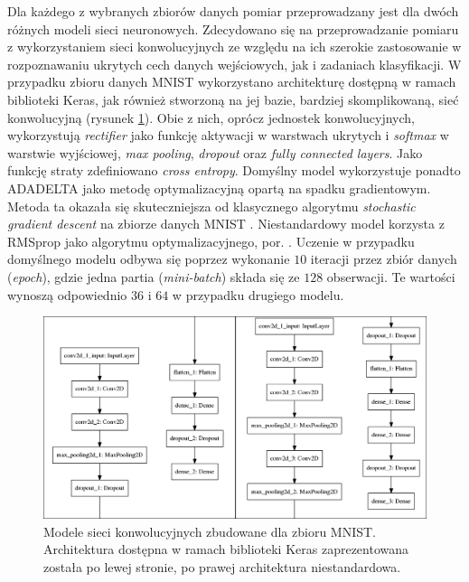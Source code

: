 \documentclass[12pt,a4paper,twoside]{article}
\begin{document}
Dla każdego z wybranych zbiorów danych pomiar przeprowadzany jest dla dwóch różnych modeli sieci neuronowych. Zdecydowano się na przeprowadzanie pomiaru z wykorzystaniem sieci konwolucyjnych ze względu na ich szerokie zastosowanie w rozpoznawaniu ukrytych cech danych wejściowych, jak i zadaniach klasyfikacji. W przypadku zbioru danych MNIST wykorzystano architekturę dostępną w ramach biblioteki Keras, jak również stworzoną na jej bazie, bardziej skomplikowaną, sieć konwolucyjną (rysunek \ref{fig:mnist_cnn}). Obie z nich, oprócz jednostek konwolucyjnych, wykorzystują \textit{rectifier} jako funkcję aktywacji w warstwach ukrytych i \textit{softmax} w warstwie wyjściowej, \textit{max pooling}, \textit{dropout} oraz \textit{fully connected layers}. Jako funkcję straty zdefiniowano \textit{cross entropy}. Domyślny model wykorzystuje ponadto ADADELTA jako metodę optymalizacyjną opartą na spadku gradientowym. Metoda ta okazała się skuteczniejsza od klasycznego algorytmu \textit{stochastic gradient descent}
na zbiorze danych MNIST \citep{zeiler2012}. Niestandardowy model korzysta z RMSprop jako algorytmu optymalizacyjnego, por. \citet{tieleman2012}. Uczenie w przypadku domyślnego modelu odbywa się poprzez wykonanie $10$ iteracji przez zbiór danych (\textit{epoch}), gdzie jedna partia (\textit{mini-batch}) składa się ze $128$ obserwacji. Te wartości wynoszą odpowiednio $36$ i $64$ w przypadku drugiego modelu.

\begin{figure}[h]
  \centering
\includegraphics[scale=0.35]{../obrazy/fig:mnist_cnn.png}
\caption{Modele sieci konwolucyjnych zbudowane dla zbioru MNIST. Architektura dostępna w ramach biblioteki Keras zaprezentowana została po lewej stronie, po prawej architektura niestandardowa.\label{fig:mnist_cnn}}
\end{figure}
\end{document}
